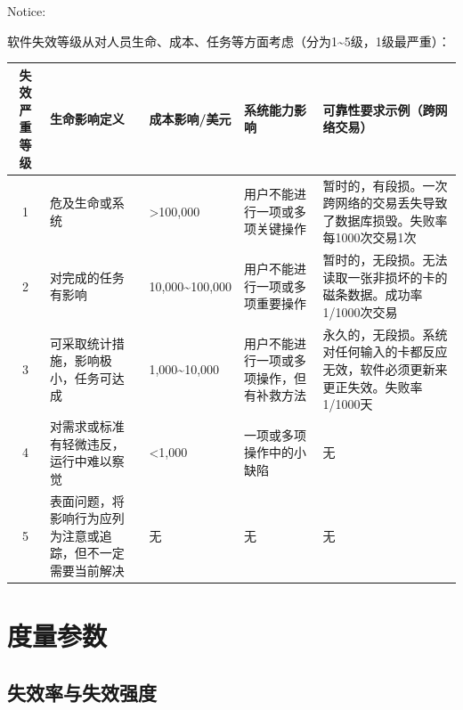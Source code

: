 Notice:

软件失效等级从对人员生命、成本、任务等方面考虑（分为1\~{}5级，1级最严重）：


\begin{tabular}{|c|m{3cm}|m{2.5cm}|m{3cm}|m{5cm}|}
  \hline
  \textbf{失效严重等级} & \textbf{生命影响定义} & \textbf{成本影响/美元} & \textbf{系统能力影响} & \textbf{可靠性要求示例（跨网络交易）} \\ \hline
  1 & 危及生命或系统 & >100,000 & 用户不能进行一项或多项关键操作 & 暂时的，有段损。一次跨网络的交易丢失导致了数据库损毁。失败率每1000次交易1次 \\ \hline
  2 & 对完成的任务有影响 & 10,000\~{}100,000 & 用户不能进行一项或多项重要操作 & 暂时的，无段损。无法读取一张非损坏的卡的磁条数据。成功率1/1000次交易 \\ \hline
  3 & 可采取统计措施，影响极小，任务可达成 & 1,000\~{}10,000 & 用户不能进行一项或多项操作，但有补救方法 & 永久的，无段损。系统对任何输入的卡都反应无效，软件必须更新来更正失效。失败率1/1000天 \\ \hline
  4 & 对需求或标准有轻微违反，运行中难以察觉 & <1,000 & 一项或多项操作中的小缺陷 & 无 \\ \hline
  5 & 表面问题，将影响行为应列为注意或追踪，但不一定需要当前解决 & 无 & 无 & 无 \\ \hline
\end{tabular}

\section{度量参数}

\subsection{失效率与失效强度}


